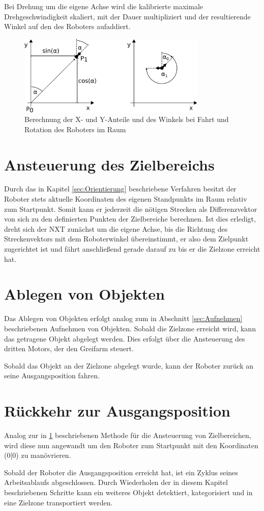 Bei Drehung um die eigene Achse wird die kalibrierte maximale Drehgeschwindigkeit skaliert, mit der Dauer multipliziert und der resultierende Winkel auf den des Roboters aufaddiert.

\begin{figure}[h]
\centering
\includegraphics[width=0.8\textwidth]{Bilder/Workloop/basicMovement}
\caption{Berechnung der X- und Y-Anteile und des Winkels bei Fahrt und Rotation des Roboters im Raum}
\label{fig:basicMovement}
\end{figure}

\section{Ansteuerung des Zielbereichs}
\label{sec:Zielbereichsansteuerung}

Durch das in Kapitel \ref{sec:Orientierung} beschriebene Verfahren besitzt der Roboter stets aktuelle Koordinaten des eigenen Standpunkts im Raum relativ zum Startpunkt. Somit kann er jederzeit die nötigen Strecken als Differenzvektor von sich zu den definierten Punkten der Zielbereiche berechnen. Ist dies erledigt, dreht sich der NXT zunächst um die eigene Achse, bis die Richtung des Streckenvektors mit dem Roboterwinkel übereinstimmt, er also dem Zielpunkt zugerichtet ist und fährt anschließend gerade darauf zu bis er die Zielzone erreicht hat.


\section{Ablegen von Objekten}

Das Ablegen von Objekten erfolgt analog zum in Abschnitt \ref{sec:Aufnehmen} beschriebenen Aufnehmen von Objekten. Sobald die Zielzone erreicht wird, kann das getragene Objekt abgelegt werden. Dies erfolgt über die Ansteuerung des dritten Motors, der den Greifarm steuert. 

Sobald das Objekt an der Zielzone abgelegt wurde, kann der Roboter zurück an seine Ausgangsposition fahren. 

\section{Rückkehr zur Ausgangsposition}

Analog zur in \ref{sec:Zielbereichsansteuerung} beschriebenen Methode für die Ansteuerung von Zielbereichen, wird diese nun angewandt um den Roboter zum Startpunkt mit den Koordinaten (0|0) zu manövrieren.

Sobald der Roboter die Ausgangsposition erreicht hat, ist ein Zyklus seines Arbeitsablaufs abgeschlossen. Durch Wiederholen der in diesem Kapitel beschriebenen Schritte kann ein weiteres Objekt detektiert, kategorisiert und in eine Zielzone transportiert werden. 